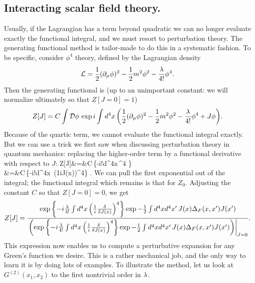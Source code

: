 \documentclass[12pt]{article}
\begin{document}
\subsection{Interacting scalar field theory.}
Usually, if the Lagrangian has a term beyond quadratic we can no longer
evaluate exactly the functional integral, and we must resort to
perturbation theory. The generating functional method is tailor-made
to do this in a systematic fashion. To be
specific, consider $\phi^4$ theory, defined by the Lagrangian density
\[
\LL=\half(\partial_\mu\phi)^2-\half m^2\phi^2-{\la\over4!}\phi^4.
\]
Then the generating functional is (up to an unimportant constant: we
will normalize ultimately so that $Z[J=0]=1$)
\[
Z[J]=C\int\DD\phi\,\exp{i\int d^4x\left(
\half(\partial_\mu\phi)^2-\half m^2\phi^2-{\la\over4!}\phi^4
+J\phi\right)}.
\]
Because of the quartic term, we cannot evaluate the functional
integral exactly. But we can use a trick we first saw when discussing
perturbation theory in quantum mechanics: replacing the higher-order
term by a functional derivative with respect to $J$:
\beano
Z[J]&=&C\int\DD\phi\,\exp\left\{{-i{\la{}!}\int d^4x\,\phi^4}
\right\}
\\
&=&C\int\DD\phi\,\exp\left\{{-i{\la{}!}\int d^4x\
\left({1\over i}{\delta\over\delta J(x)}\right)^4}\right\}
.
\eeano
We can pull the first exponential out of the integral; the functional
integral which remains is that for $Z_0$. Adjusting the constant $C$
so that $Z[J=0]=0$, we get
\[
Z[J]={
  \exp\left\{{-i{\lambda\over4!}\int d^4x
  \left({1\over i}{\delta\over\delta J(x)}\right)^4}\right\}
  \exp{-{\frac 12}\int d^4x d^4x'\,J(x)\Delta_F(x,x')J(x')}
\over
  \left.\left(\exp\left\{{-i{\lambda\over4!}\int d^4x
  \left({1\over i}{\delta\over\delta J(x)}\right)^4}\right\}
  \exp{-{\frac 12}\int d^4x d^4x'\,J(x)\Delta_F(x,x')J(x')}
  \right)\right|_{J=0}
}.
\]
This expression now enables us to compute a perturbative expansion for
any Green's function we desire. This is a rather mechanical job, and
the only way to learn it is by doing lots of examples. To illustrate
the method, let us look at $G^{(2)}(x_1,x_2)$ to the first nontrivial
order in $\lambda$.
\end{document}
